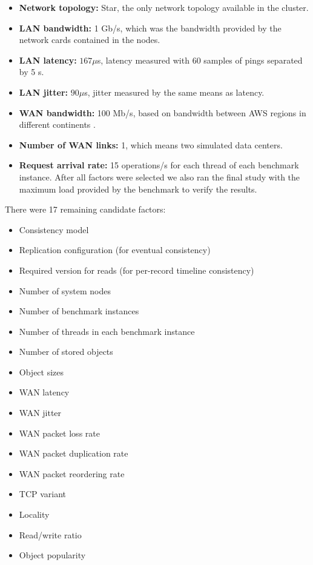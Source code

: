 \documentclass[man,floatsintext,12pt]{apa6}
\begin{document}
\begin{itemize}
\item \textbf{Network topology:} Star, the only network topology available in
the cluster.

\item \textbf{LAN bandwidth:} 1 Gb/s, which was the bandwidth provided by the
network cards contained in the nodes.

\item \textbf{LAN latency:} $167\mu$s, latency measured with 60 samples of
pings separated by 5 s.

\item \textbf{LAN jitter:} $90\mu$s, jitter measured by the same means as
latency.

\item \textbf{WAN bandwidth:} 100 Mb/s, based on bandwidth between AWS regions
in different continents \parencite{Topchiy2013}.

\item \textbf{Number of WAN links:} 1, which means two simulated data centers.

\item \textbf{Request arrival rate:} 15 operations/s for each thread of each
benchmark instance. After all factors were selected we also ran the final study
with the maximum load provided by the benchmark to verify the results.

\end{itemize}

There were 17 remaining candidate factors:

\begin{itemize}
\item Consistency model
\item Replication configuration (for eventual consistency)
\item Required version for reads (for per-record timeline consistency)
\item Number of system nodes
\item Number of benchmark instances
\item Number of threads in each benchmark instance
\item Number of stored objects
\item Object sizes
\item WAN latency
\item WAN jitter
\item WAN packet loss rate
\item WAN packet duplication rate
\item WAN packet reordering rate
\item TCP variant
\item Locality
\item Read/write ratio
\item Object popularity
\end{itemize}
\end{document}
